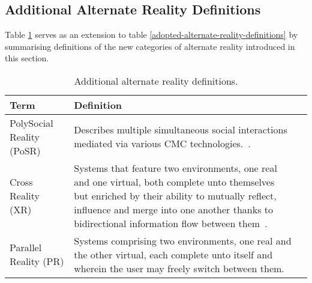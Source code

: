 
\subsection{Additional Alternate Reality Definitions}
\label{summaryofadditionalalternaterealitydefinitions}

Table \ref{additional-alternate-reality-definitions} serves as an extension to table \ref{adopted-alternate-reality-definitions} by summarising definitions of the new categories of alternate reality introduced in this section.

\begin{table}[h]
\begin{center}
\begin{tabularx}{\textwidth}{l *{2}{>{\centering\arraybackslash}X}}

\toprule

\textbf{Term} & \textbf{Definition} \\

\midrule

		
PolySocial Reality (PoSR) & Describes multiple simultaneous social interactions mediated via various CMC technologies.~\cite{Applin2012}. \\

\midrule


Cross Reality (XR) & Systems that feature two environments, one real and one virtual, both complete unto themselves~\cite{lifton:merging} but enriched by their ability to mutually reflect, influence and merge into one another thanks to bidirectional information flow between them~\cite{kim:practical}. \\

\midrule


Parallel Reality (PR) & Systems comprising two environments, one real and the other virtual, each complete unto itself and wherein the user may freely switch between them. \\


\bottomrule
\end{tabularx}
\end{center}
\caption{Additional alternate reality definitions.}
\label{additional-alternate-reality-definitions}
\end{table}

